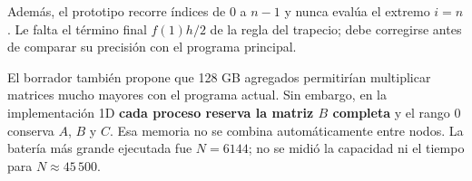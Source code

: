 Además, el prototipo  recorre índices de $0$ a $n-1$ y nunca evalúa el extremo $i=n$. Le falta el término final $f(1)h/2$ de la regla del trapecio; debe corregirse antes de comparar su precisión con el programa principal.

El borrador también propone que 128 GB agregados permitirían multiplicar matrices mucho mayores con el programa actual. Sin embargo, en la implementación 1D \textbf{cada proceso reserva la matriz $B$ completa} y el rango 0 conserva $A$, $B$ y $C$. Esa memoria no se combina automáticamente entre nodos. La batería más grande ejecutada fue $N=6144$; no se midió la capacidad ni el tiempo para $N\approx45\,500$.
